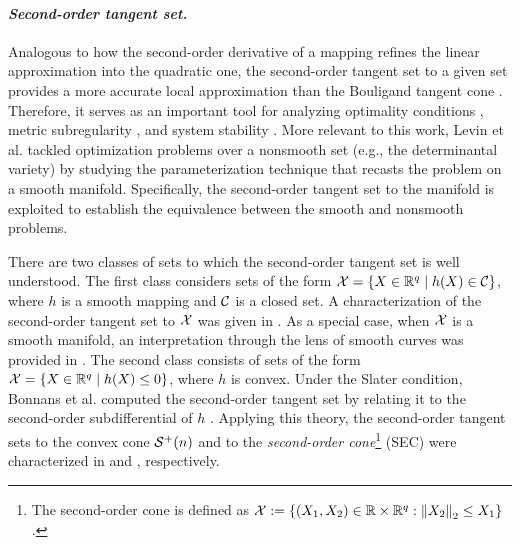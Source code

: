 \paragraph{\emph{\textbf{Second-order tangent set.}}} Analogous to how the second-order derivative of a mapping refines the linear approximation into the quadratic one, the second-order tangent set to a given set provides a more accurate local approximation than the Bouligand tangent cone \cite{bonnans2000perturbationanalysis,chen2019exactSOC}. Therefore, it serves as an important tool for analyzing optimality conditions \cite{bonnans1999parabolicset,gfrerer2022secondnonconvex}, metric subregularity \cite{gfrerer2011subregularity}, and system stability \cite{gfrerer2017robinsonstability}. More relevant to this work, Levin et al. \cite{levin2025effect} tackled optimization problems over a nonsmooth set (e.g., the determinantal variety) by studying the parameterization technique that recasts the problem on a smooth manifold. Specifically, the second-order tangent set to the manifold is exploited to establish the equivalence between the smooth and nonsmooth problems.

There are two classes of sets to which the second-order tangent set is well understood. The first class considers sets of the form $\mathcal{X} = \{X \in \mathbb{R}^q \mid h(X) \in \mathcal{C}\}$, where $h$ is a smooth mapping and $\mathcal{C}$ is a closed set. A characterization of the second-order tangent set to $\mathcal{X}$ was given in \cite[Proposition 13.13]{rockafellar2009variationalanalysis}. As a special case, when $\mathcal{X}$ is a smooth manifold, an interpretation through the lens of smooth curves was provided in \cite{levin2025effect}. The second class consists of sets of the form $\mathcal{X} = \{X \in \mathbb{R}^q \mid h(X) \le 0\}$, where $h$ is convex. Under the Slater condition, Bonnans et al. computed the second-order tangent set by relating it to the second-order subdifferential of $h$ \cite[Proposition 2.1]{bonnans1999parabolicset}. Applying this theory, the second-order tangent sets to the convex cone $\mathcal{S}^+(n)$ and to the \emph{second-order cone}\footnote{The second-order cone is defined as $\mathcal{X} := \{(X_1, X_2) \in \mathbb{R} \times \mathbb{R}^q : \left\| {X_2} \right\|_2 \le X_1 \}$.} (SEC) were characterized in \cite[Example 3.40]{bonnans2000perturbationanalysis} and \cite[Lemma 27]{bonnans2005perturbation}, respectively.

